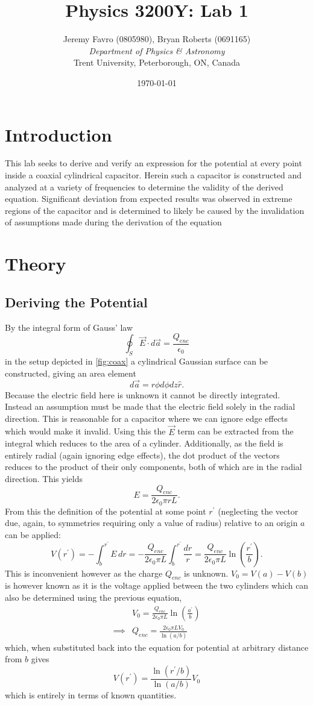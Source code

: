 \documentclass[10pt, twocolumn]{article}
\title{Physics 3200Y: Lab 1}
\author{Jeremy Favro (0805980), Bryan Roberts (0691165) 
 \\\emph{Department of Physics \& Astronomy}\\ Trent University, Peterborough, ON, Canada}
\date{\today}
\theoremstyle{definition}
\newcommand{\primed}[1]{#1^\prime}
\begin{document}
\maketitle

\listoftodos
\section{Introduction}
This lab seeks to derive and verify an expression for the potential at every point inside a coaxial cylindrical capacitor.
Herein such a capacitor is constructed and analyzed at a variety of frequencies to determine the validity of the derived equation.
Significant deviation from expected results was observed in extreme regions of the capacitor and is determined to likely be caused
by the invalidation of assumptions made during the derivation of the equation
\section{Theory}
\subsection{Deriving the Potential}
By the integral form of Gauss'
law
$$\oint_{S}\vec{E}\cdot d\vec{a}=\frac{Q_{enc}}{\epsilon_0}$$
in the setup depicted in \ref{fig:coax} a cylindrical Gaussian surface can be constructed, giving an area element
$$d\vec{a}=r\phi d\phi dz\hat{r}.$$
Because the electric field here is unknown it cannot be directly integrated.
Instead an assumption must be made that the electric field solely in the radial direction.
This is reasonable for a capacitor where we can ignore edge effects which would make it invalid.
Using this the $\vec{E}$ term can be extracted from the integral which reduces
to the area of a cylinder. Additionally, as the field is entirely radial
(again ignoring edge effects), the dot product of the vectors reduces
to the product of their only components, both of which are in the radial direction. This yields
$$E=\frac{Q_{enc}}{2\epsilon_0\pi r L}.$$
From this the definition of the potential at some point $\primed{r}$ (neglecting the
vector due, again, to symmetries requiring only a value of radius) relative to an origin $a$ can be applied:
$$V(\primed{r})
  =-\int_{b}^{\primed{r}}E\,dr
  =-\frac{Q_{enc}}{2\epsilon_0\pi L}\int_{b}^{\primed{r}}\frac{dr}{r}
  =\frac{Q_{enc}}{2\epsilon_0\pi L}\ln\left(\frac{\primed{r}}{b}\right).$$
This is inconvenient however as the charge $Q_{enc}$ is unknown.
$V_0=V(a)-V(b)$ is however known as it is the voltage applied between the two cylinders
which can also be determined using the previous equation,
\begin{align*}
           & V_0     =\frac{Q_{enc}}{2\epsilon_0\pi L}\ln\left(\frac{\primed{a}}{b}\right) \\
  \implies & Q_{enc} =\frac{2\epsilon_0\pi L V_0}{\ln\left(a/b\right)}
\end{align*}
which, when substituted back into the equation for potential at arbitrary distance from $b$ gives
$$V(\primed{r})=
  \frac{\ln\left(\primed{r}/b\right)}{\ln\left(a/b\right)}V_0$$
which is entirely in terms of known quantities.
\clearpage
\end{document}
